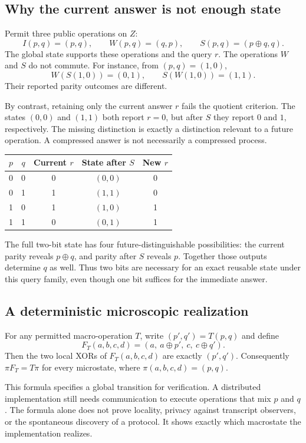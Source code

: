\documentclass[11pt,letterpaper]{article}
\theoremstyle{plain}
\theoremstyle{definition}
\theoremstyle{remark}
\begin{document}
\subsection{Why the current answer is not enough state}
Permit three public operations on $Z$:
\[
I(p,q)=(p,q),\qquad W(p,q)=(q,p),\qquad S(p,q)=(p\oplus q,q).
\]
The global state supports these operations and the query $r$. The operations $W$ and $S$ do not commute. For instance, from $(p,q)=(1,0)$,
\[
W(S(1,0))=(0,1),\qquad S(W(1,0))=(1,1).
\]
Their reported parity outcomes are different.

By contrast, retaining only the current answer $r$ fails the quotient criterion. The states $(0,0)$ and $(1,1)$ both report $r=0$, but after $S$ they report $0$ and $1$, respectively. The missing distinction is exactly a distinction relevant to a future operation. A compressed answer is not necessarily a compressed process.

\begin{center}
\begin{tabular}{@{}ccccc@{}}
\toprule
$p$ & $q$ & Current $r$ & State after $S$ & New $r$\\
\midrule
0&0&0&$(0,0)$&0\\
0&1&1&$(1,1)$&0\\
1&0&1&$(1,0)$&1\\
1&1&0&$(0,1)$&1\\
\bottomrule
\end{tabular}
\end{center}

The full two-bit state has four future-distinguishable possibilities: the current parity reveals $p\oplus q$, and parity after $S$ reveals $p$. Together those outputs determine $q$ as well. Thus two bits are necessary for an exact reusable state under this query family, even though one bit suffices for the immediate answer.

\subsection{A deterministic microscopic realization}
For any permitted macro-operation $T$, write $(p',q')=T(p,q)$ and define
\[
F_T(a,b,c,d)=(a,\ a\oplus p',\ c,\ c\oplus q').
\]
Then the two local XORs of $F_T(a,b,c,d)$ are exactly $(p',q')$. Consequently $\pi F_T=T\pi$ for every microstate, where $\pi(a,b,c,d)=(p,q)$.

This formula specifies a global transition for verification. A distributed implementation still needs communication to execute operations that mix $p$ and $q$. The formula alone does not prove locality, privacy against transcript observers, or the spontaneous discovery of a protocol. It shows exactly which macrostate the implementation realizes.
\end{document}
